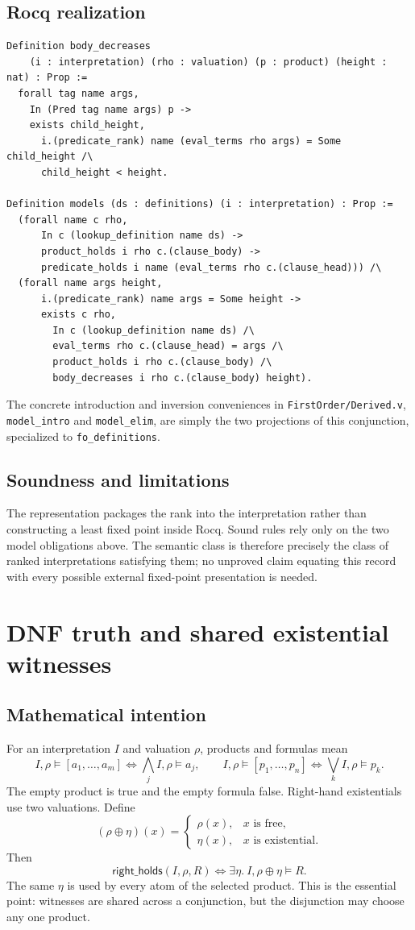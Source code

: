 \documentclass[11pt,oneside]{book}
\DeclareRobustCommand{\code}[1]{\nolinkurl{#1}}
\DeclareRobustCommand{\file}[1]{\nolinkurl{#1}}
\newcommand{\holds}{\models}
\newcommand{\mathintent}{\subsection*{Mathematical intention}}
\newcommand{\rocqreal}{\subsection*{Rocq realization}}
\newcommand{\soundlim}{\subsection*{Soundness and limitations}}
\begin{document}
\rocqreal

\begin{lstlisting}[caption={The two-sided model condition.}]
Definition body_decreases
    (i : interpretation) (rho : valuation) (p : product) (height : nat) : Prop :=
  forall tag name args,
    In (Pred tag name args) p ->
    exists child_height,
      i.(predicate_rank) name (eval_terms rho args) = Some child_height /\
      child_height < height.

Definition models (ds : definitions) (i : interpretation) : Prop :=
  (forall name c rho,
      In c (lookup_definition name ds) ->
      product_holds i rho c.(clause_body) ->
      predicate_holds i name (eval_terms rho c.(clause_head))) /\
  (forall name args height,
      i.(predicate_rank) name args = Some height ->
      exists c rho,
        In c (lookup_definition name ds) /\
        eval_terms rho c.(clause_head) = args /\
        product_holds i rho c.(clause_body) /\
        body_decreases i rho c.(clause_body) height).
\end{lstlisting}
The concrete introduction and inversion conveniences in
\file{FirstOrder/Derived.v}, \code{model_intro} and \code{model_elim}, are simply
the two projections of this conjunction, specialized to
\code{fo_definitions}.

\soundlim

The representation packages the rank into the interpretation rather than
constructing a least fixed point inside Rocq.  Sound rules rely only on the two
model obligations above.  The semantic class is therefore precisely the class
of ranked interpretations satisfying them; no unproved claim equating this
record with every possible external fixed-point presentation is needed.

\section{DNF truth and shared existential witnesses}

\mathintent

For an interpretation \(I\) and valuation \(\rho\), products and formulas mean
\[
 I,\rho\holds[a_1,\ldots,a_m]
   \iff \bigwedge_j I,\rho\holds a_j,
 \qquad
 I,\rho\holds[p_1,\ldots,p_n]
   \iff \bigvee_k I,\rho\holds p_k.
\]
The empty product is true and the empty formula false.  Right-hand
existentials use two valuations.  Define
\[
 (\rho\oplus\eta)(x)=
 \begin{cases}
 \rho(x),&x\text{ is free},\\
 \eta(x),&x\text{ is existential}.
 \end{cases}
\]
Then
\[
 \mathsf{right\_holds}(I,\rho,R)
   \iff \exists\eta.\ I,\rho\oplus\eta\holds R.
\]
The same \(\eta\) is used by every atom of the selected product.  This is the
essential point: witnesses are shared across a conjunction, but the disjunction
may choose any one product.
\end{document}
